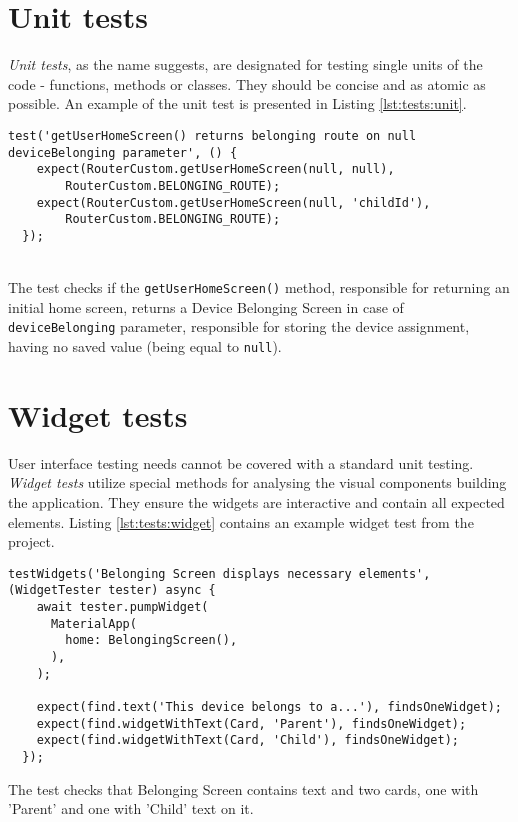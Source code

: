 \section{Unit tests}\label{sec:tests:unit}
\textit{Unit tests}, as the name suggests, are designated for testing single units of the code - functions, methods or classes. They should be concise and as atomic as possible. An example of the unit test is presented in Listing \ref{lst:tests:unit}.
\\
\begin{lstlisting}[caption={A project unit test example}, label={lst:tests:unit}, captionpos={b}]
  test('getUserHomeScreen() returns belonging route on null deviceBelonging parameter', () {
    expect(RouterCustom.getUserHomeScreen(null, null),
        RouterCustom.BELONGING_ROUTE);
    expect(RouterCustom.getUserHomeScreen(null, 'childId'),
        RouterCustom.BELONGING_ROUTE);
  });
\end{lstlisting}
\\
The test checks if the \texttt{getUserHomeScreen()} method, responsible for returning an initial home screen, returns a Device Belonging Screen in case of \texttt{deviceBelonging} parameter, responsible for storing the device assignment, having no saved value (being equal to \texttt{null}).


\section{Widget tests}\label{sec:tests:widget}
User interface testing needs cannot be covered with a standard unit testing. \textit{Widget tests} utilize special methods for analysing the visual components building the application. They ensure the widgets are interactive and contain all expected elements. Listing \ref{lst:tests:widget} contains an example widget test from the project.
\\
\begin{lstlisting}[caption={A project widget test example}, label={lst:tests:widget}, captionpos={b}]
testWidgets('Belonging Screen displays necessary elements',
(WidgetTester tester) async {
    await tester.pumpWidget(
      MaterialApp(
        home: BelongingScreen(),
      ),
    );

    expect(find.text('This device belongs to a...'), findsOneWidget);
    expect(find.widgetWithText(Card, 'Parent'), findsOneWidget);
    expect(find.widgetWithText(Card, 'Child'), findsOneWidget);
  });
\end{lstlisting}
The test checks that Belonging Screen contains  text and two cards, one with 'Parent' and one with 'Child' text on it.


